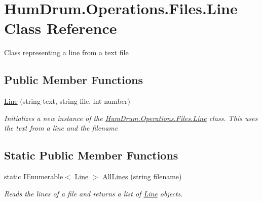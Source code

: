 \hypertarget{classHumDrum_1_1Operations_1_1Files_1_1Line}{}\section{Hum\+Drum.\+Operations.\+Files.\+Line Class Reference}
\label{classHumDrum_1_1Operations_1_1Files_1_1Line}


Class representing a line from a text file  


\subsection*{Public Member Functions}
\begin{DoxyCompactItemize}
\item 
\hyperlink{classHumDrum_1_1Operations_1_1Files_1_1Line_a0156389122d6b73dc7d12dfa3025c89c}{Line} (string text, string file, int number)
\begin{DoxyCompactList}\small\item\em Initializes a new instance of the \hyperlink{classHumDrum_1_1Operations_1_1Files_1_1Line}{Hum\+Drum.\+Operations.\+Files.\+Line} class. This uses the text from a line and the filename \end{DoxyCompactList}\end{DoxyCompactItemize}
\subsection*{Static Public Member Functions}
\begin{DoxyCompactItemize}
\item 
static I\+Enumerable$<$ \hyperlink{classHumDrum_1_1Operations_1_1Files_1_1Line}{Line} $>$ \hyperlink{classHumDrum_1_1Operations_1_1Files_1_1Line_a0e5baa7df28beb4d8549ff7a3106bf82}{All\+Lines} (string filename)
\begin{DoxyCompactList}\small\item\em Reads the lines of a file and returns a list of \hyperlink{classHumDrum_1_1Operations_1_1Files_1_1Line}{Line} objects. \end{DoxyCompactList}\end{DoxyCompactItemize}
